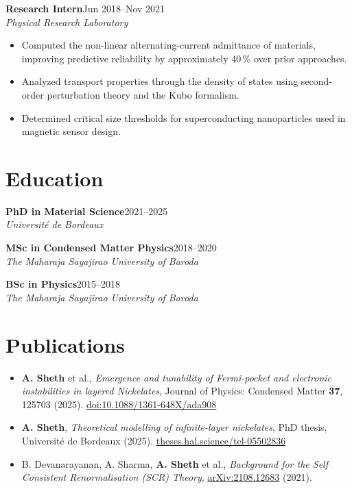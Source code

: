 \documentclass[10pt,a4paper]{article}
\newcommand{\entry}[3]{%
  \textbf{#1}\hfill{\ttfamily\footnotesize\color{dim}#3}\\
  {\itshape\color{dim}#2}\vspace{2pt}}
\begin{document}
\entry{Research Intern}
      {Physical Research Laboratory}
      {Jun 2018–Nov 2021}
\begin{itemize}
  \item Computed the non-linear alternating-current admittance of materials, improving
        predictive reliability by approximately 40\,\% over prior approaches.
  \item Analyzed transport properties through the density of states using second-order
        perturbation theory and the Kubo formalism.
  \item Determined critical size thresholds for superconducting nanoparticles used in
        magnetic sensor design.
\end{itemize}

\section{Education}

\entry{PhD in Material Science}{Université de Bordeaux}{2021–2025}

\vspace{5pt}
\entry{MSc in Condensed Matter Physics}{The Maharaja Sayajirao University of Baroda}{2018–2020}

\vspace{5pt}
\entry{BSc in Physics}{The Maharaja Sayajirao University of Baroda}{2015–2018}

\section{Publications}

\begin{itemize}
  \item \textbf{A. Sheth} et al., \emph{Emergence and tunability of Fermi-pocket and
        electronic instabilities in layered Nickelates},
        Journal of Physics: Condensed Matter \textbf{37}, 125703 (2025).
        \href{https://doi.org/10.1088/1361-648X/ada908}{doi:10.1088/1361-648X/ada908}
  \item \textbf{A. Sheth}, \emph{Theoretical modelling of infinite-layer nickelates},
        PhD thesis, Université de Bordeaux (2025).
        \href{https://theses.hal.science/tel-05502836}{theses.hal.science/tel-05502836}
  \item B. Devanarayanan, A. Sharma, \textbf{A. Sheth} et al.,
        \emph{Background for the Self Consistent Renormalisation (SCR) Theory},
        \href{https://arxiv.org/abs/2108.12683}{arXiv:2108.12683} (2021).
\end{itemize}
\end{document}
